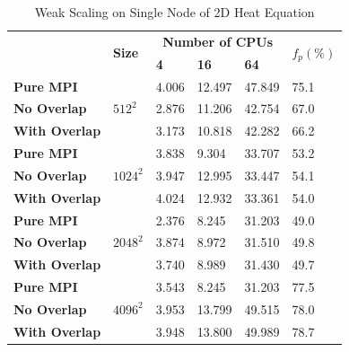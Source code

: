 \begin{table}
  \caption{Weak Scaling on Single Node of 2D Heat Equation}
  \label{TAB:Benchmark:Weak_PURE_MPI}
  \begin{minipage}{\columnwidth}
    \begin{center}
      \footnotesize %
      \begin{tabular}{>{\bfseries}p{3cm} p{1.5cm} p{1.5cm} p{1.5cm} p{1.5cm} p{1cm}}
        \toprule
        \multirow{2}{*}{Strategy}     & \multirow{2}{*}{\bfseries Size} & \multicolumn{3}{c}{\bfseries  Number of CPUs}   & \multirow{2}{*}{\bfseries $f_p(\%)$}  \\
                                      &                                  & \bfseries 4   & \bfseries 16   & \bfseries 64  &                                       \\
        \midrule
        Pure MPI      & \multirow{3}{*}{$512^2$}      & 4.006  & 12.497  & 47.849                                         & 75.1 \\
        No Overlap    &                               & 2.876  & 11.206  & 42.754                                         & 67.0 \\
        With Overlap  &                               & 3.173  & 10.818  & 42.282                                         & 66.2 \\
        \midrule
        Pure MPI      & \multirow{3}{*}{$1024^2$}     & 3.838  & 9.304   & 33.707                                         & 53.2  \\
        No Overlap    &                               & 3.947  & 12.995  & 33.447                                         & 54.1 \\
        With Overlap  &                               & 4.024  & 12.932  & 33.361                                         &  54.0 \\
        \midrule
        Pure MPI      & \multirow{3}{*}{$2048^2$}     & 2.376  & 8.245   & 31.203                                         &  49.0\\
        No Overlap    &                               & 3.874  & 8.972   & 31.510                                         &  49.8 \\
        With Overlap  &                               & 3.740  & 8.989   & 31.430                                         &  49.7 \\
        \midrule
        Pure MPI      & \multirow{3}{*}{$4096^2$}     & 3.543  & 8.245   & 31.203                                         &  77.5\\
        No Overlap    &                               & 3.953  & 13.799  & 49.515                                         &  78.0\\
        With Overlap  &                               & 3.948  & 13.800  & 49.989                                         &  78.7 \\
        \bottomrule
      \end{tabular}
    \end{center}
  \end{minipage}
\end{table}

